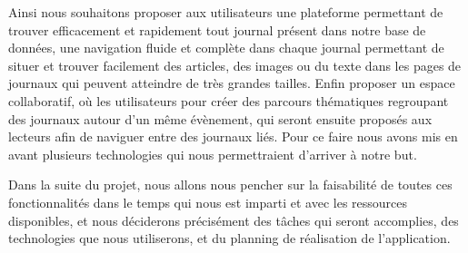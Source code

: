 Ainsi nous souhaitons proposer aux utilisateurs une plateforme permettant de trouver efficacement et rapidement
tout journal présent dans notre base de données, une navigation fluide et complète dans chaque journal permettant
de situer et trouver facilement des articles, des images ou du texte dans les pages de journaux qui peuvent
atteindre de très grandes tailles. Enfin proposer un espace collaboratif, où les utilisateurs pour créer
des parcours thématiques regroupant des journaux autour d’un même évènement, qui seront ensuite proposés
aux lecteurs afin de naviguer entre des journaux liés. Pour ce faire nous avons mis en avant plusieurs
technologies qui nous permettraient d’arriver à notre but.

Dans la suite du projet, nous allons nous pencher sur la faisabilité de toutes ces fonctionnalités
dans le temps qui nous est imparti et avec les ressources disponibles, et nous déciderons précisément
des tâches qui seront accomplies, des technologies que nous utiliserons, et du planning de réalisation
de l’application.

